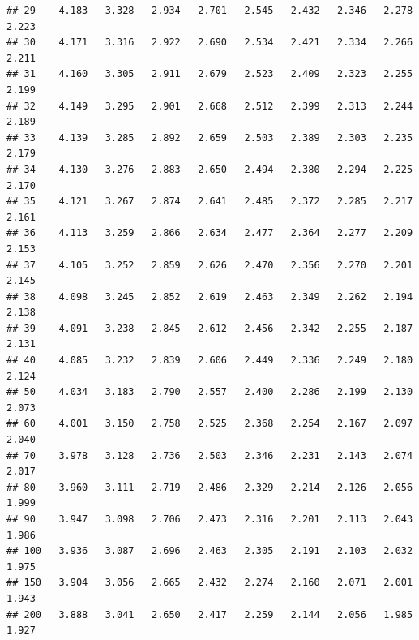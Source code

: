 \documentclass[onecolumn,12pt]{book}\usepackage[]{graphicx}\usepackage[]{color}
\makeatletter
\newenvironment{kframe}{%
 \def\at@end@of@kframe{}%
 \ifinner\ifhmode%
  \def\at@end@of@kframe{\end{minipage}}%
  \begin{minipage}{\columnwidth}%
 \fi\fi%
 \def\FrameCommand##1{\hskip\@totalleftmargin \hskip-\fboxsep
 \colorbox{shadecolor}{##1}\hskip-\fboxsep
     \hskip-\linewidth \hskip-\@totalleftmargin \hskip\columnwidth}%
 \MakeFramed {\advance\hsize-\width
   \@totalleftmargin\z@ \linewidth\hsize
   \@setminipage}}%
 {\par\unskip\endMakeFramed%
 \at@end@of@kframe}
\newenvironment{knitrout}{}{} %
\makeatother
\begin{document}
\begin{knitrout}
\begin{kframe}
\begin{verbatim}
## 29    4.183   3.328   2.934   2.701   2.545   2.432   2.346   2.278   2.223
## 30    4.171   3.316   2.922   2.690   2.534   2.421   2.334   2.266   2.211
## 31    4.160   3.305   2.911   2.679   2.523   2.409   2.323   2.255   2.199
## 32    4.149   3.295   2.901   2.668   2.512   2.399   2.313   2.244   2.189
## 33    4.139   3.285   2.892   2.659   2.503   2.389   2.303   2.235   2.179
## 34    4.130   3.276   2.883   2.650   2.494   2.380   2.294   2.225   2.170
## 35    4.121   3.267   2.874   2.641   2.485   2.372   2.285   2.217   2.161
## 36    4.113   3.259   2.866   2.634   2.477   2.364   2.277   2.209   2.153
## 37    4.105   3.252   2.859   2.626   2.470   2.356   2.270   2.201   2.145
## 38    4.098   3.245   2.852   2.619   2.463   2.349   2.262   2.194   2.138
## 39    4.091   3.238   2.845   2.612   2.456   2.342   2.255   2.187   2.131
## 40    4.085   3.232   2.839   2.606   2.449   2.336   2.249   2.180   2.124
## 50    4.034   3.183   2.790   2.557   2.400   2.286   2.199   2.130   2.073
## 60    4.001   3.150   2.758   2.525   2.368   2.254   2.167   2.097   2.040
## 70    3.978   3.128   2.736   2.503   2.346   2.231   2.143   2.074   2.017
## 80    3.960   3.111   2.719   2.486   2.329   2.214   2.126   2.056   1.999
## 90    3.947   3.098   2.706   2.473   2.316   2.201   2.113   2.043   1.986
## 100   3.936   3.087   2.696   2.463   2.305   2.191   2.103   2.032   1.975
## 150   3.904   3.056   2.665   2.432   2.274   2.160   2.071   2.001   1.943
## 200   3.888   3.041   2.650   2.417   2.259   2.144   2.056   1.985   1.927
\end{verbatim}
\end{kframe}
\end{knitrout}
 \vfill
\eject
\end{document}
